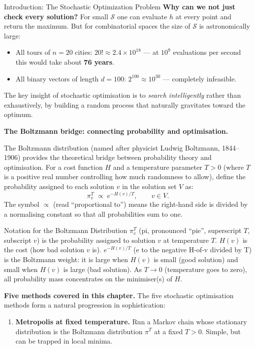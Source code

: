 \documentclass[aspectratio=169,10pt]{beamer}
\newcommand{\calS}{\mathcal{S}}
\begin{document}
\begin{frame}[allowframebreaks]{Introduction: The Stochastic Optimization Problem}
\medskip
\textbf{Why can we not just check every solution?}
For small $\calS$ one can evaluate $h$ at every point and return the
maximum.  But for combinatorial spaces the size of $\calS$ is astronomically
large:
\begin{itemize}
  \item All tours of $n = 20$ cities: $20! \approx 2.4 \times 10^{18}$ --- at
    $10^9$ evaluations per second this would take about \textbf{76 years}.
  \item All binary vectors of length $d = 100$: $2^{100} \approx 10^{30}$
    --- completely infeasible.
\end{itemize}
The key insight of stochastic optimisation is to \emph{search intelligently}
rather than exhaustively, by building a random process that naturally
gravitates toward the optimum.

\framebreak

\textbf{The Boltzmann bridge: connecting probability and optimisation.}

The Boltzmann distribution (named after physicist Ludwig Boltzmann,
1844--1906) provides the theoretical bridge between probability theory and
optimisation.  For a cost function $H$ and a temperature parameter $T > 0$
(where $T$ is a positive real number controlling how much randomness to
allow), define the probability assigned to each solution $v$ in the solution
set $V$ as:
\[
  \pi^T_v \;\propto\; e^{-H(v)/T}, \qquad v \in V.
\]
The symbol $\propto$ (read ``proportional to'') means the right-hand side is
divided by a normalising constant so that all probabilities sum to one.

\begin{block}{Notation for the Boltzmann Distribution}
  $\pi^T_v$ (pi, pronounced ``pie'', superscript $T$, subscript $v$) is
  the probability assigned to solution $v$ at temperature $T$.  $H(v)$ is
  the cost (how bad solution $v$ is).  $e^{-H(v)/T}$ (e to the negative
  H-of-v divided by T) is the Boltzmann weight: it is large when $H(v)$ is
  small (good solution) and small when $H(v)$ is large (bad solution).  As
  $T \to 0$ (temperature goes to zero), all probability mass concentrates on
  the minimiser(s) of $H$.
\end{block}

\textbf{Five methods covered in this chapter.}
The five stochastic optimisation methods form a natural progression in
sophistication:

\begin{enumerate}
  \item \textbf{Metropolis at fixed temperature.}  Run a Markov chain whose
    stationary distribution is the Boltzmann distribution $\pi^T$ at a fixed
    $T > 0$.  Simple, but can be trapped in local minima.


\end{enumerate}
\end{frame}
\end{document}
